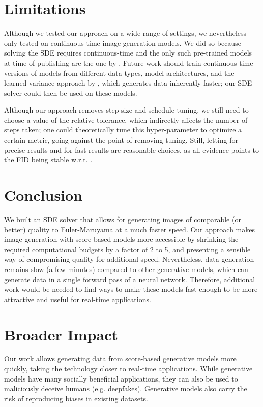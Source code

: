 \documentclass{article}
\begin{document}
\section{Limitations}

Although we tested our approach on a wide range of settings, we nevertheless only tested on continuous-time image generation models. We did so because solving the SDE requires continuous-time and the only such pre-trained models at time of publishing are the one by \citet{song2020score}. 
Future work should train continuous-time versions of models from different data types, model architectures, and the learned-variance approach by \citet{nichol2021improved}, which generates data inherently faster; our SDE solver could then be used on these models.

Although our approach removes step size and schedule tuning, we still need to choose a value of the relative tolerance, which indirectly affects the number of steps taken; one could theoretically tune this hyper-parameter to optimize a certain metric, going against the point of removing tuning. Still, letting  for precise results and  for fast results are reasonable choices, as all evidence points to the FID being stable w.r.t. .

\section{Conclusion}

We built an SDE solver that allows for generating images of comparable (or better) quality to Euler-Maruyama at a much faster speed. Our approach makes image generation with score-based models more accessible by shrinking the required computational budgets by a factor of 2 to 5, and presenting a sensible way of compromising quality for additional speed. Nevertheless, data generation remains slow (a few minutes) compared to other generative models, which can generate data in a single forward pass of a neural network.
Therefore, additional work would be needed to find ways to make these models fast enough to be more attractive and useful for real-time applications.

\section{Broader Impact}
Our work allows generating data from score-based generative models more quickly, taking the technology closer to real-time applications.
While generative models have many socially beneficial applications, they can also be used to maliciously deceive humans (e.g. deepfakes). Generative models also carry the risk of reproducing biases in existing datasets.
\end{document}
